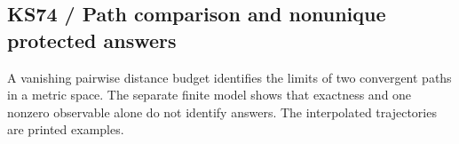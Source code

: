 \par\noindent\begin{minipage}{\linewidth}\subsection*{KS74 / Path comparison and nonunique protected answers}
A vanishing pairwise distance budget identifies the limits of two convergent paths in a metric space. The separate finite model shows that exactness and one nonzero observable alone do not identify answers. The interpolated trajectories are printed examples.
\par\smallskip{}\par
\par\smallskip{}\par
\smallskip\noindent{\color{KomorebiMuted}\rule{\linewidth}{.3pt}}\par\end{minipage}\par\medskip
{}
